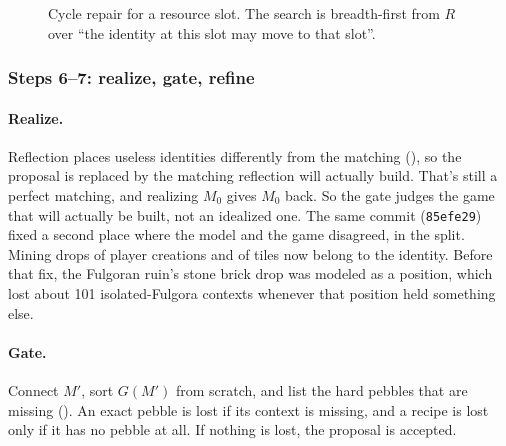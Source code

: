 \begin{figure}[tbp]
\centering
{}
\caption{Cycle repair for a resource slot. The search is breadth-first from $R$ over ``the identity at this slot may move to that slot''.}
\label{fig:cycle}
\end{figure}

\subsubsection{Steps 6--7: realize, gate, refine}
\label{sec:gate}

\paragraph{Realize.} Reflection places useless identities differently from the matching (), so the proposal is replaced by the matching reflection will actually build. That's still a perfect matching, and realizing $M_0$ gives $M_0$ back. So the gate judges the game that will actually be built, not an idealized one. The same commit (\texttt{85efe29}) fixed a second place where the model and the game disagreed, in the split. Mining drops of player creations and of tiles now belong to the identity. Before that fix, the Fulgoran ruin's stone brick drop was modeled as a position, which lost about 101 isolated-Fulgora contexts whenever that position held something else.

\paragraph{Gate.} Connect $M'$, sort $G(M')$ from scratch, and list the hard pebbles that are missing (). An exact pebble is lost if its context is missing, and a recipe is lost only if it has no pebble at all. If nothing is lost, the proposal is accepted.

